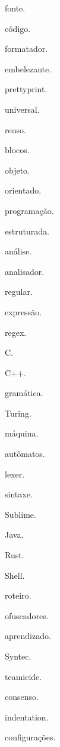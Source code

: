 {%
    \item fonte. \item código. \item formatador. \item embelezante. \item prettyprint. \item
    universal. \item reuso. \item blocos. \item objeto. \item orientado. \item programação. \item
    estruturada. \item análise. \item analisador. \item regular. \item expressão. \item regex. \item
    C. \item C++. \item gramática. \item Turing. \item máquina. \item autômatos. \item lexer. \item
    sintaxe. \item Sublime. \item Java. \item Rust. \item Shell. \item roteiro. \item ofuscadores.
    \item aprendizado. \item Syntec. \item teamicide. \item consenso. \item indentation. \item
    configurações.
}

\xpatchcmd{\citacao}
{\list{}}
{\list{}{\topsep=0pt}}
{}
{}

\addto\captionsbrazil
{
    \renewcommand{\orientadorname}{Orientador}
    \renewcommand{\coorientadorname}{Coorientador}
}

